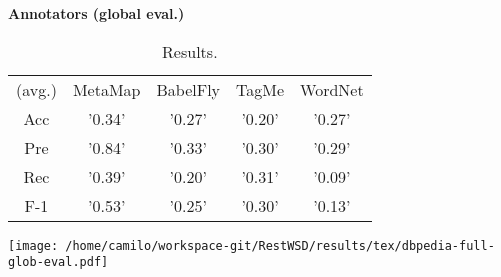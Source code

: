 \begin{center}\textbf{\Large Annotators (global eval.)}\end{center}
\begin{center}\begin{table}[p]\centering
\begin{tabular}{ccccc}
(avg.) & MetaMap & BabelFly & TagMe & WordNet\\ 
Acc & '0.34' & '0.27' & '0.20' & '0.27'\\ 
Pre & '0.84' & '0.33' & '0.30' & '0.29'\\ 
Rec & '0.39' & '0.20' & '0.31' & '0.09'\\ 
F-1 & '0.53' & '0.25' & '0.30' & '0.13'\\ 

\end{tabular}\caption{Results.}\end{table}\end{center}



\vspace{0.2cm}

\begin{center}
\texttt{[image: /home/camilo/workspace-git/RestWSD/results/tex/dbpedia-full-glob-eval.pdf]}
\end{center}
\newpage
